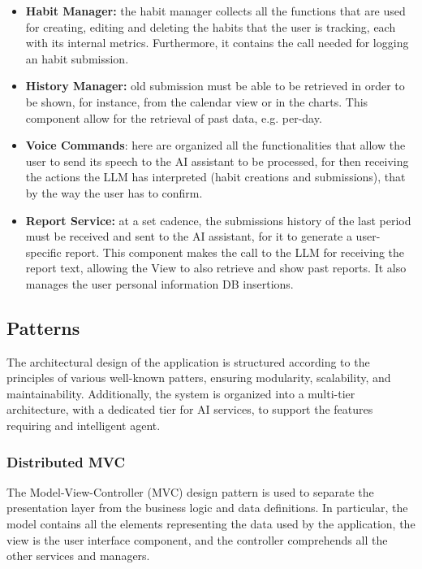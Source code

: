 \documentclass{article}
\begin{document}
\begin{itemize}
    \item \textbf{Habit Manager:} the habit manager collects all the functions that are used for creating, editing and deleting the habits that the user is tracking, each with its internal metrics. Furthermore, it contains the call needed for logging an habit submission.
    \item \textbf{History Manager:} old submission must be able to be retrieved in order to be shown, for instance, from the calendar view or in the charts. This component allow for the retrieval of past data, e.g. per-day.
    \item \textbf{Voice Commands}: here are organized all the functionalities that allow the user to send its speech to the AI assistant to be processed, for then receiving the actions the LLM has interpreted (habit creations and submissions), that by the way the user has to confirm.
    \item \textbf{Report Service:} at a set cadence, the submissions history of the last period must be received and sent to the AI assistant, for it to generate a user-specific report. This component makes the call to the LLM for receiving the report text, allowing the View to also retrieve and show past reports. It also manages the user personal information DB insertions.
\end{itemize}

\subsection{Patterns}

The architectural design of the application is structured according to the principles of various well-known patters, ensuring modularity, scalability, and maintainability.
Additionally, the system is organized into a multi-tier architecture, with a dedicated tier for AI services, to support the features requiring and intelligent agent.

\subsubsection{Distributed MVC}

The Model-View-Controller (MVC) design pattern is used to separate the presentation layer from the business logic and data definitions.
In particular, the model contains all the elements representing the data used by the application, the view is the user interface component, and the controller comprehends all the other services and managers.
\end{document}
